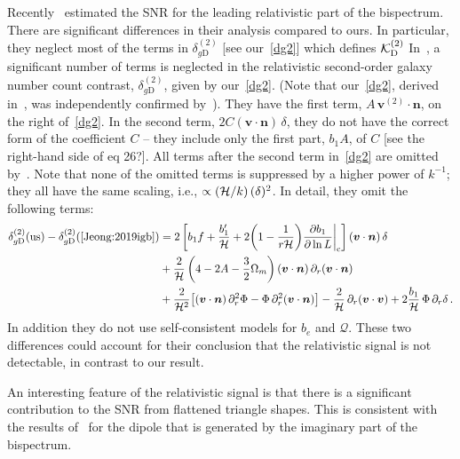 Recently~\cite{Jeong:2019igb} estimated the  SNR for the leading relativistic part of the bispectrum.  There are significant differences in their analysis compared to ours. In particular, they neglect most of the terms in $\delta_{g \mathrm{D}}^{(2)}$ [see our~\eqref{dg2}] which defines ${\cal K}^{(2)}_{\mathrm{D}}$ 
In~\cite{Jeong:2019igb}, a significant number of terms is neglected in the relativistic second-order  galaxy number count contrast, $\delta_{g\mathrm{D}}^{(2)}$, given by our~\eqref{dg2}. (Note that our~\eqref{dg2}, derived in~\cite{Clarkson:2018dwn}, was independently confirmed by~\cite{DiDio:2018zmk}). They have the first term, $A\, \bm{v}^{(2)}\!\!\cdot\bm{n}$, on the right of~\eqref{dg2}.  In the second term, $2{C}(\bm{v}\cdot\bm{n})\,\delta$, they do not have the correct form of the coefficient $C$ -- they include only the first part, $b_1A$, of $C$ [see the right-hand side of eq 26?]. All terms after the second term in~\eqref{dg2} are omitted by~\cite{Jeong:2019igb}. Note that none of the omitted terms is suppressed by a higher power of $k^{-1}$;  they all have the same scaling, i.e., $\propto (\mathcal{H}/k)\,{(\delta)^2}$. In detail, they omit the following
terms:
\begin{align}
\delta_{g\mathrm{D}}^{(2)}({\mathrm{us}})- \delta_{g\mathrm{D}}^{(2)}(\mbox{{\cite{Jeong:2019igb}}}) &= 2\left[b_{1}f + \frac{b_1'}{\mathcal{H}} 
+ 2\bigg(1-\frac{1}{{r} \mathcal{H}}\bigg){\frac{\partial b_1}{\partial \ln{L}}\bigg|_{\mathrm{c}}} \right](\bm{v}\cdot\bm{n})\,\delta 
\\\nonumber
& 
+ \frac{2}{\mathcal{H}}\left(4-2A-\frac{3}{2}\Omega_{m} \right)(\bm{v}\cdot\bm{n})\,\partial_r(\bm{v}\cdot\bm{n})\\
\nonumber
&
+ \frac{2}{\mathcal{H}^2}\big[(\bm{v}\cdot\bm{n}) \,\partial_r^2\Phi-\Phi\, \partial_r^2 (\bm{v}\cdot\bm{n}) \big]
 - \frac{2}{\mathcal{H}}\,\partial_r (\bm{v}\cdot\bm{v}) + 2 \frac{b_1}{\mathcal{H}}\,\Phi\, \partial_r\delta \,. 
\end{align} In addition they do not use self-consistent models for $b_{e}$ and $\mathcal{Q}$. These two differences could account for their conclusion that the relativistic signal is not detectable, in contrast to our result. 


An interesting feature of the relativistic signal is that there is a significant contribution to the SNR from  flattened triangle shapes. This is consistent with the results of~\cite{Clarkson:2018dwn} for the dipole that is generated by the imaginary part of the bispectrum.
%
%

